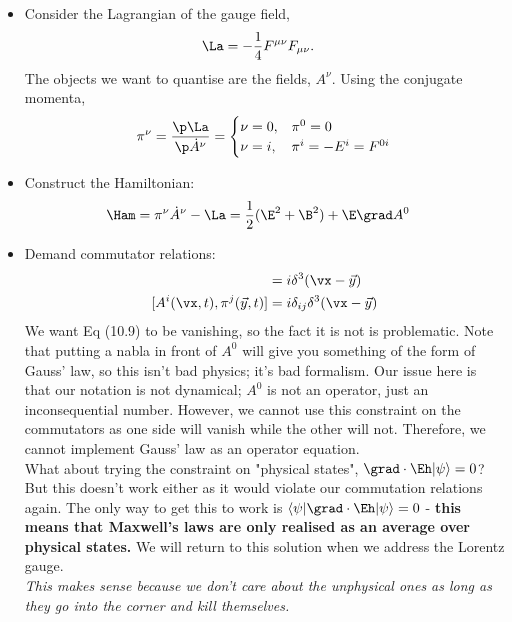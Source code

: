 \documentclass[a4paper, 11pt, normalem]{report}
\begin{document}
\begin{itemize}
    \item Consider the Lagrangian of the gauge field,
        \begin{align}
            \La &= -\frac14 F^{\mu\nu}F_{\mu\nu}.
        \end{align}
        The objects we want to quantise are the fields, $A^\nu$.
        Using the conjugate momenta,
        \begin{align}
            \pi^\nu &= \frac{\p\La}{\p\dot{A}^\nu} = \begin{cases} \nu = 0, & \pi^0 = 0 \\ \nu = i, & \pi^i = -E^i = F^{0i}\end{cases} \\
        \end{align}
    \item Construct the Hamiltonian:
        \begin{align}
            \Ham &= \pi^\nu\dot{A}^\nu - \La = \frac12(\E^2+\B^2) + \E\grad A^0
        \end{align}
    \item Demand commutator relations:
        \begin{align}
            [A^0(\vx,t),\pi^0(\vec{y},t)] &= i\delta^3(\vx-\vec{y}) \\
            [A^i(\vx,t),\pi^j(\vec{y},t)] &= i\delta_{ij}\delta^3(\vx-\vec{y})
        \end{align}
        We want Eq (10.9) to be vanishing, so the fact it is not is problematic.
        Note that putting a nabla in front of $A^0$ will give you something of the form of Gauss' law, so this isn't bad physics; it's bad formalism.
        Our issue here is that our notation is not dynamical; $A^0$ is not an operator, just an inconsequential number.
        However, we cannot use this constraint on the commutators as one side will vanish while the other will not.
        Therefore, we cannot implement Gauss' law as an operator equation.\\
        What about trying the constraint on "physical states", $\grad\cdot\Eh|\psi\rangle = 0$?
        But this doesn't work either as it would violate our commutation relations again.
        The only way to get this to work is $\langle\psi|\grad\cdot\Eh|\psi\rangle=0$ - \textbf{this means that Maxwell's laws are only realised as an average over physical states.}
        We will return to this solution when we address the Lorentz gauge.\\
        \textit{This makes sense because we don't care about the unphysical ones as long as they go into the corner and kill themselves.}

\end{itemize}
\end{document}
